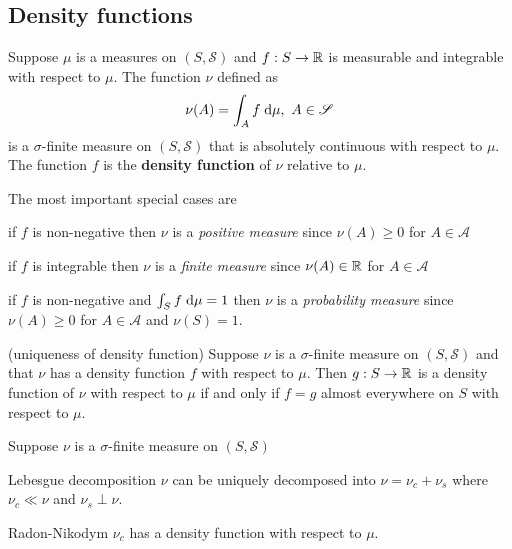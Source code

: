 \subsection{Density functions}

\begin{definition}
Suppose $\mu$ is a measures on $(S, \mathscr{S})$ and $f : S \to \mathbb{R}$ is measurable and integrable with respect to $\mu$. The function $\nu$ defined as
\begin{equation}
\nu(A) = \int_A f \; \text{d} \mu, \ A \in \mathscr{S}
\end{equation}
is a $\sigma$-finite measure on $(S, \mathscr{S})$ that is absolutely continuous with respect to $\mu$. 
The function $f$ is the \textbf{density function} of $\nu$ relative to $\mu$.
\end{definition}

The most important special cases are
\begin{compactitem}
\item if $f$ is non-negative then $\nu$ is a \emph{positive measure} since $\nu(A) \geq 0$ for $A \in \mathscr{A}$
\item if $f$ is integrable then $\nu$ is a \emph{finite measure} since $\nu(A) \in \mathbb{R}$ for $A \in \mathscr{A}$
\item if $f$ is non-negative and $\int_S f \; \text{d} \mu = 1$ then $\nu$ is a \emph{probability measure} since $\nu(A) \geq 0$ for $A \in \mathscr{A}$ and $\nu(S) = 1$.
\end{compactitem}

\begin{theorem}(uniqueness of density function)
Suppose $\nu$ is a $\sigma$-finite measure on $(S, \mathscr{S})$ and that $\nu$ has a density function $f$ with respect to $\mu$. Then $g : S \to \mathbb{R}$ is a density function of $\nu$ with respect to $\mu$ if and only if $f = g$ almost everywhere on $S$ with respect to $\mu$.
\end{theorem}

\begin{theorem}
Suppose $\nu$ is a $\sigma$-finite measure on $(S, \mathscr{S})$
\begin{compactdesc}
\item [Lebesgue decomposition] $\nu$ can be uniquely decomposed into $\nu = \nu_c + \nu_s$ where $\nu_c \ll \nu$ and $\nu_s \perp \nu$.
\item [Radon-Nikodym] $\nu_c$ has a density function with respect to $\mu$.
\end{compactdesc}
\end{theorem}

